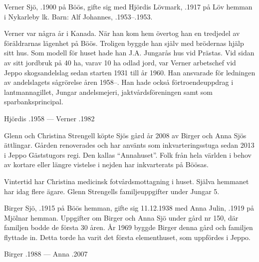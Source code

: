Verner Sjö,  .1900 på Böös, gifte sig med Hjördis Lövmark, .1917 på Löv hemman i Nykarleby lk. Barn: Alf Johannes, .1953--.1953.

Verner var några år i Kanada. När han kom hem övertog han en tredjedel av föräldrarnas lägenhet på Böös. Troligen byggde han själv med brödernas hjälp sitt hus. Som modell för huset hade han J.A. Jungarås hus vid Prästas. Vid sidan av sitt jordbruk på 40 ha, varav 10 ha odlad jord, var Verner arbetschef vid Jeppo skogsandelslag sedan starten 1931 till år 1960. Han ansvarade för ledningen av andelslagets sågrörelse åren 1958--. Han hade också förtroendeuppdrag i lantmannagillet, Jungar andelsmejeri, jaktvårdsföreningen samt som sparbanksprincipal.

Hjördis .1958  ---  Verner .1982






Glenn och Christina Strengell köpte Sjös gård år 2008 av Birger och Anna Sjös ättlingar. Gården renoverades och har använts som inkvarteringsstuga sedan 2013 i Jeppo Gäststugors regi. Den kallas ``Annahuset''. Folk från hela världen i behov av kortare eller längre vistelse i nejden har inkvarterats på Böösas.

Vintertid har Christina medicinsk fotvårdsmottagning i huset. Själva hemmanet har idag flere ägare. Glenn Strengells familjeuppgifter under Jungar 5.


Birger Sjö, .1915 på Böös hemman, gifte sig 11.12.1938 med Anna Julin, .1919 på Mjölnar hemman. Uppgifter om Birger och Anna Sjö under gård nr 150, där familjen bodde de första 30 åren. År 1969 byggde Birger denna gård och familjen flyttade in. Detta torde ha varit det första elementhuset, som uppfördes i Jeppo.

Birger .1988  ---  Anna .2007





